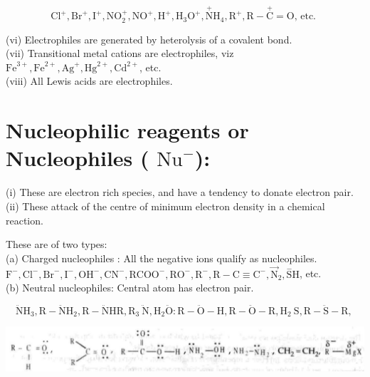 \documentclass[10pt]{article}
\begin{document}
$$
\mathrm{Cl}^{+}, \mathrm{Br}^{+}, \mathrm{I}^{+}, \mathrm{NO}_{2}^{+}, \mathrm{NO}^{+}, \mathrm{H}^{+}, \mathrm{H}_{3} \mathrm{O}^{+}, \stackrel{+}{\mathrm{N}} \mathrm{H}_{4}, \mathrm{R}^{+}, \mathrm{R}-\stackrel{+}{\mathrm{C}}=\mathrm{O} \text {, etc. }
$$

(vi) Electrophiles are generated by heterolysis of a covalent bond.\\
(vii) Transitional metal cations are electrophiles, viz $\mathrm{Fe}^{3+}, \mathrm{Fe}^{2+}, \mathrm{Ag}^{+}, \mathrm{Hg}^{2+}, \mathrm{Cd}^{2+}$, etc.\\
(viii) All Lewis acids are electrophiles.

\section*{Nucleophilic reagents or Nucleophiles ( $\mathrm{Nu}^{-}$):}
(i) These are electron rich species, and have a tendency to donate electron pair.\\
(ii) These attack of the centre of minimum electron density in a chemical reaction.

These are of two types:\\
(a) Charged nucleophiles : All the negative ions qualify as nucleophiles.\\
$\mathrm{F}^{-}, \mathrm{Cl}^{-}, \mathrm{Br}^{-}, \mathrm{I}^{-}, \mathrm{OH}^{-}, \mathrm{CN}^{-}, \mathrm{RCOO}^{-}, \mathrm{RO}^{-}, \mathrm{R}^{-}, \mathrm{R}-\mathrm{C} \equiv \mathrm{C}^{-}, \overrightarrow{\mathrm{N}}_{2}, \stackrel{-}{\mathrm{S}} \mathrm{H}$, etc.\\
(b) Neutral nucleophiles: Central atom has electron pair.

$$
\ddot{\mathrm{N}} \mathrm{H}_{3}, \mathrm{R}-\ddot{\mathrm{N}} \mathrm{H}_{2}, \mathrm{R}-\ddot{\mathrm{N}} \mathrm{HR}, \mathrm{R}_{3} \ddot{\mathrm{~N}}, \mathrm{H}_{2} \ddot{\mathrm{O}}: \mathrm{R}-\ddot{\mathrm{O}}-\mathrm{H}, \mathrm{R}-\ddot{\mathrm{O}}-\mathrm{R}, \mathrm{H}_{2} \mathrm{~S}, \mathrm{R}-\ddot{\mathrm{S}}-\mathrm{R} \text {, }
$$

\begin{center}
\includegraphics[max width=\textwidth]{2025_01_28_8470952b98110cec3aabg-066}
\end{center}
\end{document}
